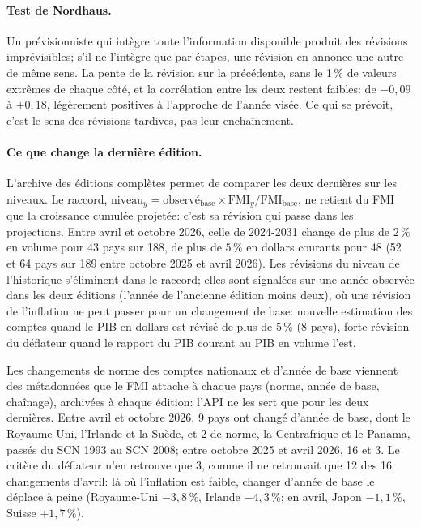 \documentclass[11pt,a4paper]{article}
\begin{document}
\paragraph{Test de Nordhaus.} Un prévisionniste qui intègre toute l'information disponible produit des révisions imprévisibles; s'il ne l'intègre que par étapes, une révision en annonce une autre de même sens. La pente de la révision sur la précédente, sans le 1\,\% de valeurs extrêmes de chaque côté, et la corrélation entre les deux restent faibles: de $-0{,}09$ à $+0{,}18$, légèrement positives à l'approche de l'année visée. Ce qui se prévoit, c'est le sens des révisions tardives, pas leur enchaînement.

\paragraph{Ce que change la dernière édition.} L'archive des éditions complètes permet de comparer les deux dernières sur les niveaux. Le raccord, $\text{niveau}_y = \text{observé}_{\text{base}} \times \text{FMI}_y / \text{FMI}_{\text{base}}$, ne retient du FMI que la croissance cumulée projetée: c'est sa révision qui passe dans les projections. Entre avril et octobre 2026, celle de 2024-2031 change de plus de $2\,\%$ en volume pour 43 pays sur 188, de plus de $5\,\%$ en dollars courants pour 48 (52 et 64 pays sur 189 entre octobre 2025 et avril 2026). Les révisions du niveau de l'historique s'éliminent dans le raccord; elles sont signalées sur une année observée dans les deux éditions (l'année de l'ancienne édition moins deux), où une révision de l'inflation ne peut passer pour un changement de base: nouvelle estimation des comptes quand le PIB en dollars est révisé de plus de $5\,\%$ (8 pays), forte révision du déflateur quand le rapport du PIB courant au PIB en volume l'est.

Les changements de norme des comptes nationaux et d'année de base viennent des métadonnées que le FMI attache à chaque pays (norme, année de base, chaînage), archivées à chaque édition: l'API ne les sert que pour les deux dernières. Entre avril et octobre 2026, 9 pays ont changé d'année de base, dont le Royaume-Uni, l'Irlande et la Suède, et 2 de norme, la Centrafrique et le Panama, passés du SCN 1993 au SCN 2008; entre octobre 2025 et avril 2026, 16 et 3. Le critère du déflateur n'en retrouve que 3, comme il ne retrouvait que 12 des 16 changements d'avril: là où l'inflation est faible, changer d'année de base le déplace à peine (Royaume-Uni $-3{,}8\,\%$, Irlande $-4{,}3\,\%$; en avril, Japon $-1{,}1\,\%$, Suisse $+1{,}7\,\%$).
\end{document}
